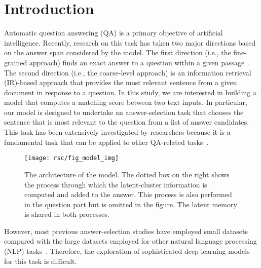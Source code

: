 \documentclass[sigconf]{acmart}
\begin{document}



\maketitle

\section{Introduction}
\label{sec:introduction}
Automatic question answering (QA) is a primary objective of artificial intelligence. 
Recently, research on this task has taken two major directions based on the answer span considered by the model.
The first direction (i.e., the fine-grained approach) finds an exact answer to a question within a given passage~\cite{rajpurkar2016squad}.
The second direction (i.e., the coarse-level approach) is an information retrieval (IR)-based approach that provides the most relevant sentence from a given document in response to a question.
In this study, we are interested in building a model that computes a matching score between two text inputs.
In particular, our model is designed to undertake an answer-selection task that chooses the sentence that is most relevant to the question from a list of answer candidates.
This task has been extensively investigated by researchers because it is a fundamental task that can be applied to other QA-related tasks~\cite{wang2016compare,bian2017compare,shen2017inter,tran2018context,tay2018multi,madabushi2018integrating}.
\begin{figure*}[t]
\centering
\texttt{[image: rsc/fig\_model\_img]}
\caption{
The architecture of the model. The dotted box on the right shows the process through which the latent-cluster information is computed and added to the answer. This process is also performed in the question part but is omitted in the figure. The latent memory is shared in both processes.
}
\label{fig:model}
\end{figure*} 
However, most previous answer-selection studies have employed small datasets~\cite{wang2007jeopardy,yang2015wikiqa} compared with the large datasets employed for other natural language processing (NLP) tasks~\cite{lowe2015ubuntu,rajpurkar2016squad}.
Therefore, the exploration of sophisticated deep learning models for this task is difficult.
\end{document}
